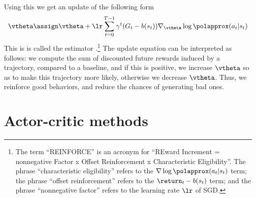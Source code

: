 Using this we get an update of the following form
\begin{align}
  \vtheta \assign \vtheta + \lr \sum_{t=0}^{T-1}
  \gamma^t (G_t - b(s_t)) \nabla_{\vtheta} \log\polapprox(a_t|s_t)
\label{eqn:REINFORCE}
\end{align}
This is 
is called the  estimator
\citep{Williams1992}.\footnote{
  The term 
``REINFORCE'' is an acronym for
``REward Increment = nonnegative Factor x Offset
Reinforcement x Characteristic Eligibility''.
The phrase ``characteristic eligibility'' refers to  the
$\nabla \log \polapprox(a_t|s_t)$ term;
the phrase ``offset reinforcement'' refers to the
$\return_t-b(s_t)$ term;
and the phrase ``nonnegative factor''
refers to the learning rate $\lr$ of SGD.
} %
The update equation
 can be interpreted as follows:
we compute the sum of discounted future rewards
induced by a trajectory, compared to a
baseline,  and if this is positive, we increase
$\vtheta$ so as to make this trajectory more likely,
otherwise we decrease $\vtheta$.
Thus, we reinforce good behaviors,
and reduce the chances of generating bad ones.





\section{Actor-critic methods}
\label{sec:actorCritic}
\label{sec:AC}




